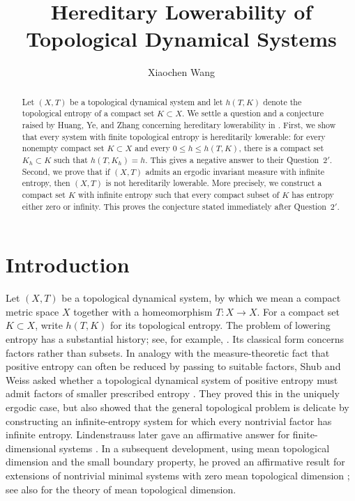 \documentclass[12pt,letterpaper,reqno]{amsart}
\title[Hereditary Lowerability]{Hereditary Lowerability of Topological Dynamical Systems}
\author[X. Wang]{Xiaochen Wang}
\date{}
\theoremstyle{definition}
\theoremstyle{remark}
\numberwithin{equation}{section}
\begin{document}
	
	\begin{abstract}
		Let $(X,T)$ be a topological dynamical system and let $h(T,K)$ denote the topological
		entropy of a compact set $K\subset X$. We settle a question and a
		conjecture raised by Huang, Ye, and Zhang concerning hereditary lowerability in \cite{HYZ2014}.
		First, we show that every system with finite topological entropy is hereditarily lowerable:
		for every nonempty compact set $K\subset X$ and every
		$0\leq h\leq h(T,K)$, there is a compact set $K_h\subset K$ such that
		$h(T,K_h)=h$. This gives a negative answer to their Question~$2'$.
		Second, we prove that if $(X,T)$ admits an ergodic invariant measure with infinite entropy, then $(X,T)$ is not hereditarily lowerable. More precisely, we construct a compact set $K$ with infinite entropy such that every compact subset
		of $K$ has entropy either zero or infinity. This proves the conjecture stated
		immediately after Question~$2'$.
	\end{abstract}
	
	\maketitle
	\pagestyle{headings}
	\markboth{}{}
	
	\section{Introduction}
	\label{sec:introduction}
	
	Let $(X,T)$ be a topological dynamical system, by which we mean a compact
	metric space $X$ together with a homeomorphism $T\colon X\to X$. For a compact
	set $K\subset X$, write $h(T,K)$ for its topological entropy. The problem of
	lowering entropy has a substantial history; see, for example,
	\cite{ShubWeiss1991,Lindenstrauss1995}. 
	Its classical form concerns factors rather than subsets. 
	In analogy with the measure-theoretic fact that positive entropy can often be reduced by passing to suitable factors, Shub and Weiss asked whether a topological dynamical system of positive entropy must admit factors of smaller prescribed entropy \cite{ShubWeiss1991}. 
	They proved this in the uniquely ergodic case, but also showed that the general topological problem is delicate by constructing an infinite-entropy system for which every nontrivial factor has infinite entropy. Lindenstrauss later gave an affirmative answer for finite-dimensional systems \cite{Lindenstrauss1995}. 
	In a subsequent development, using mean topological dimension and the small boundary property, he proved an affirmative result for extensions of nontrivial minimal systems with zero mean topological dimension \cite{Lindenstrauss1999}; see also \cite{LindenstraussWeiss2000} for the theory of mean topological dimension.
	
\end{document}
